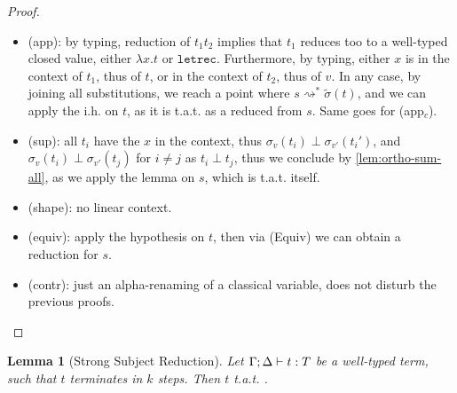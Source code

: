 \documentclass[10pt,a4paper]{article}
\newcommand{\textletrec}{\ensuremath{\mathtt{letrec}}}
\newcommand{\lbd}[2]{\lambda #1 .#2}
\newcommand{\typing}[4]{
  \ifx&#1&\varnothing \else #1\fi; 
  \ifx&#2&\varnothing \else #2\fi 
  \vdash {#3} : #4
}
\newcommand{\reduces}{\rightsquigarrow}
\newcommand{\sreduces}{\reduces^*}
\newcommand{\ie}{\text{i.e., }}
\newtheorem{lemma}[theorem]{Lemma}
\begin{document}
\begin{proof}
\begin{itemize}
    \item (app): by typing, reduction of $t_1t_2$ implies
      that $t_1$ reduces too to a well-typed closed value,
      \ie either $\lbd x t$ or \textletrec{}.
      Furthermore, by typing,
      either $x$ is in the context of $t_1$, thus of $t$, or in
      the context of $t_2$, thus of $v$.
      In any case, by joining all substitutions, we reach a point
      where $s \sreduces \tilde \sigma(t)$, and we can apply the i.h. on $t$,
      as it is t.a.t. as a reduced from $s$. Same goes for (app$_c$).

    \item (sup): all $t_i$ have the $x$ in the context, thus
      $\sigma_v(t_i) \perp \sigma_{v'}(t_i')$,
      and $\sigma_v(t_i) \perp \sigma_{v'}(t_j)$ for $i \neq j$ as
      $t_i \perp t_j$, thus we conclude by \autoref{lem:ortho-sum-all},
      as we apply the lemma on $s$, which is t.a.t. itself.

    \item (shape): no linear context.

    \item (equiv): apply the hypothesis on $t$, then via (Equiv) we
      can obtain a reduction for $s$.

    \item (contr): just an alpha-renaming of a classical variable,
      does not disturb the previous proofs. \qedhere
  \end{itemize}
\end{proof}

\begin{lemma}[Strong Subject Reduction]
  \label{lem:subred-strong}
  Let $\typing \Gamma \Delta t T$ be a well-typed term,
  such that $t$ terminates in $k$ steps.
  Then $t$ t.a.t. .
\end{lemma}
\end{document}
